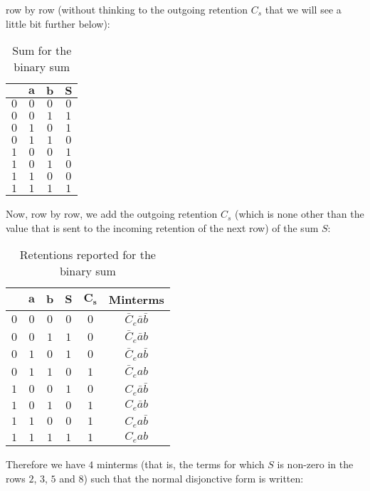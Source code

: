 	row by row (without thinking to the outgoing retention $C_s$ that we will see a little bit further below):
	\begin{table}[H]
		\centering
		\begin{tabular}{|c|c|c|c|}
		\hline
		\rowcolor[HTML]{9B9B9B} 
		\multicolumn{1}{|l|}{\cellcolor[HTML]{9B9B9B}$\pmb{C_e}$} & \multicolumn{1}{l|}{\cellcolor[HTML]{9B9B9B}$\pmb{a}$} & \multicolumn{1}{l|}{\cellcolor[HTML]{9B9B9B}$\pmb{b}$} & \multicolumn{1}{l|}{\cellcolor[HTML]{9B9B9B}$\pmb{S}$} \\ \hline
		$0$ & $0$ & $0$ & $0$ \\ \hline
		$0$ & $0$ & $1$ & $1$ \\ \hline
		$0$ & $1$ & $0$ & $1$ \\ \hline
		$0$ & $1$ & $1$ & $0$ \\ \hline
		$1$ & $0$ & $0$ & $1$ \\ \hline
		$1$ & $0$ & $1$ & $0$ \\ \hline
		$1$ & $1$ & $0$ & $0$ \\ \hline
		$1$ & $1$ & $1$ & $1$ \\ \hline
		\end{tabular}
		\caption{Sum for the binary sum}
	\end{table}
	Now, row by row, we add the outgoing retention $C_s$ (which is none other than the value that is sent to the incoming retention of the next row) of the sum $S$:
	\begin{table}[H]
		\centering
		\begin{tabular}{|c|c|c|c|c|c|}
		\hline
		\rowcolor[HTML]{9B9B9B} 
		\multicolumn{1}{|l|}{\cellcolor[HTML]{9B9B9B}$\pmb{C_e}$} & \multicolumn{1}{l|}{\cellcolor[HTML]{9B9B9B}$\pmb{a}$} & \multicolumn{1}{l|}{\cellcolor[HTML]{9B9B9B}$\pmb{b}$} & \multicolumn{1}{l|}{\cellcolor[HTML]{9B9B9B}$\pmb{S}$} & \multicolumn{1}{l|}{\cellcolor[HTML]{9B9B9B}$\pmb{C_s}$} & \multicolumn{1}{l|}{\cellcolor[HTML]{9B9B9B}\textbf{Minterms}} \\ \hline
		$0$ & $0$ & $0$ & $0$ & $0$ & $\bar{C}_e\bar{a}\bar{b}$  \\ \hline
		$0$ & $0$ & $1$ & $1$ & $0$ & $\bar{C}_e\bar{a}b$  \\ \hline
		$0$ & $1$ & $0$ & $1$ & $0$ & $\bar{C}_ea\bar{b}$ \\ \hline
		$0$ & $1$ & $1$ & $0$ & $1$ & $\bar{C}_eab$  \\ \hline
		$1$ & $0$ & $0$ & $1$ & $0$ & $C_e\bar{a}\bar{b}$  \\ \hline
		$1$ & $0$ & $1$ & $0$ & $1$ & $C_e\bar{a}b$  \\ \hline
		$1$ & $1$ & $0$ & $0$ & $1$ & $C_e a\bar{b}$   \\ \hline
		$1$ & $1$ & $1$ & $1$ & $1$ & $C_eab$  \\ \hline
		\end{tabular}
		\caption{Retentions reported for the binary sum}
	\end{table}
	Therefore we have $4$ minterms (that is, the terms for which $S$ is non-zero in the rows $2$, $3$, $5$ and $8$) such that the normal disjonctive form is written:
	
